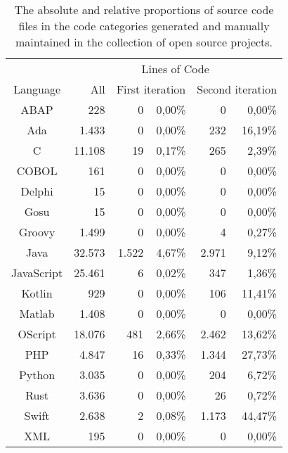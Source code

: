 \setlength{\extrarowheight}{-.0em}
\begin{table}
	\caption[Source code file distributions in the collection of open source projects.]{The absolute and relative proportions of source code files in the code categories generated and manually maintained in the collection of open source projects. }
	\label{table:countGit}
	\begin{tabularx}{\textwidth}{c|r|r|r|r|r}
		& \multicolumn{5}{c}{Lines of Code}  \\
		Language & All & \multicolumn{2}{c|}{First iteration} & \multicolumn{2}{c}{Second iteration}  \\
		\hline
		ABAP & 228 & 0 & 0,00\% & 0 & 0,00\% \\
		Ada & 1.433 & 0 & 0,00\% & 232 & 16,19\% \\
		C & 11.108 & 19 & 0,17\% & 265 & 2,39\% \\
		COBOL & 161 & 0 & 0,00\% & 0 & 0,00\% \\
		Delphi & 15 & 0 & 0,00\% & 0 & 0,00\% \\
		Gosu & 15 & 0 & 0,00\% & 0 & 0,00\% \\
		Groovy & 1.499 & 0 & 0,00\% & 4 & 0,27\% \\
		Java & 32.573 & 1.522 & 4,67\% & 2.971 & 9,12\% \\
		JavaScript & 25.461 & 6 & 0,02\% & 347 & 1,36\% \\
		Kotlin & 929 & 0 & 0,00\% & 106 & 11,41\% \\
		Matlab & 1.408 & 0 & 0,00\% & 0 & 0,00\% \\
		OScript & 18.076 & 481 & 2,66\% & 2.462 & 13,62\% \\
		PHP & 4.847 & 16 & 0,33\% & 1.344 & 27,73\% \\
		Python & 3.035 & 0 & 0,00\% & 204 & 6,72\% \\
		Rust & 3.636 & 0 & 0,00\% & 26 & 0,72\% \\
		Swift & 2.638 & 2 & 0,08\% & 1.173 & 44,47\% \\
		XML & 195 & 0 & 0,00\% & 0 & 0,00\% \\		
	\end{tabularx}
\end{table}
\setlength{\extrarowheight}{0em}